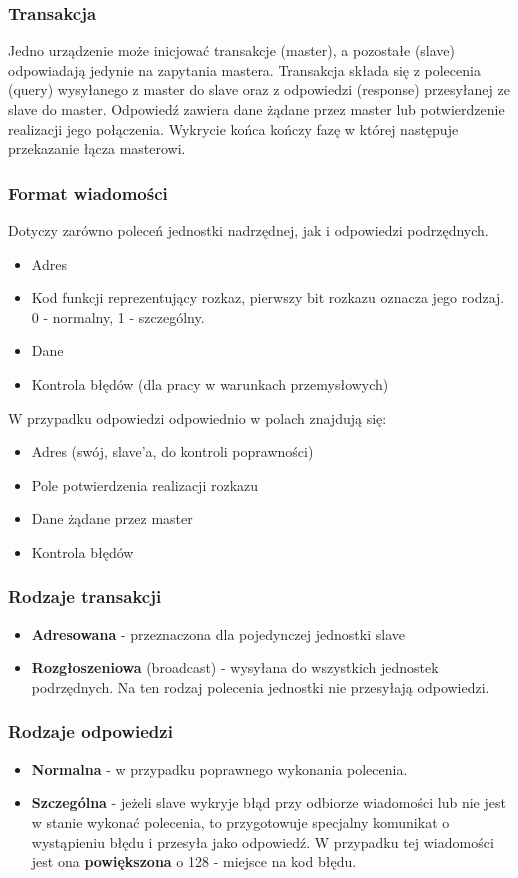 		\subsubsection{Transakcja}
		Jedno urządzenie może inicjować transakcje (master), a pozostałe (slave) odpowiadają jedynie na zapytania mastera. Transakcja składa się z polecenia (query) wysyłanego z master do slave oraz z odpowiedzi (response) przesyłanej ze slave do master. Odpowiedź zawiera dane żądane przez master lub potwierdzenie realizacji jego połączenia. Wykrycie końca kończy fazę w której następuje przekazanie łącza masterowi.\\
		\subsubsection{Format wiadomości}
		Dotyczy zarówno poleceń jednostki nadrzędnej, jak i odpowiedzi podrzędnych.
		\begin{itemize}
			\item Adres
			\item Kod funkcji reprezentujący rozkaz, pierwszy bit rozkazu oznacza jego rodzaj. 0 - normalny, 1 - szczególny.
			\item Dane
			\item Kontrola błędów (dla pracy w warunkach przemysłowych)
		\end{itemize}
		W przypadku odpowiedzi odpowiednio w polach znajdują się:
		\begin{itemize}
			\item Adres (swój, slave'a, do kontroli poprawności)
			\item Pole potwierdzenia realizacji rozkazu
			\item Dane żądane przez master
			\item Kontrola błędów
		\end{itemize}
		\subsubsection{Rodzaje transakcji}
			\begin{itemize}
				\item \textbf{Adresowana} - przeznaczona dla pojedynczej jednostki slave
				\item \textbf{Rozgłoszeniowa} (broadcast) - wysyłana do wszystkich jednostek podrzędnych. Na ten rodzaj polecenia jednostki nie przesyłają odpowiedzi.
			\end{itemize}
		\subsubsection{Rodzaje odpowiedzi}
			\begin{itemize}
				\item \textbf{Normalna} - w przypadku poprawnego wykonania polecenia.
				\item \textbf{Szczególna} - jeżeli slave wykryje błąd przy odbiorze wiadomości lub nie jest w stanie wykonać polecenia, to przygotowuje specjalny komunikat o wystąpieniu błędu i przesyła jako odpowiedź. W przypadku tej wiadomości jest ona \textbf{powiększona} o 128 - miejsce na kod błędu.
			\end{itemize}
